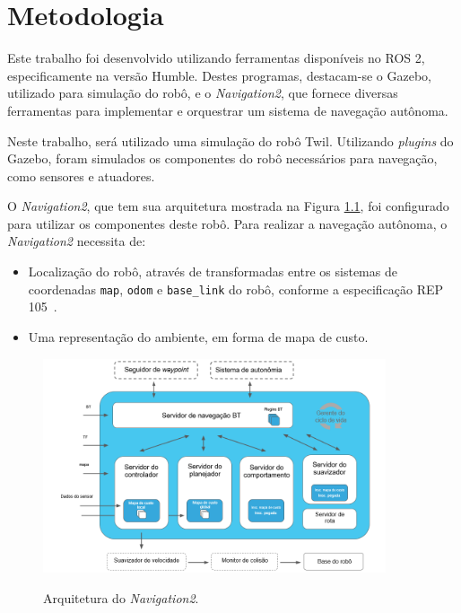 \documentclass[repeatfields,xlists,xpacks,oneside,yearsonly]{ufrgscca}
\begin{document}
\chapter{Metodologia}
\label{desenvolvimento}

Este trabalho foi desenvolvido utilizando ferramentas disponíveis 
no ROS 2, especificamente na versão Humble.
Destes programas, destacam-se o Gazebo, utilizado para simulação do robô,
e o \textit{Navigation2}, que fornece diversas ferramentas para implementar
e orquestrar um sistema de navegação autônoma.

Neste trabalho, será utilizado uma simulação do robô Twil.
Utilizando \textit{plugins} do Gazebo, foram simulados
os componentes do robô necessários para navegação,
como sensores e atuadores.

O \textit{Navigation2}, que tem sua arquitetura mostrada na Figura
 \ref{fig:nav2_arc}, foi configurado para utilizar os componentes
 deste robô.
Para realizar a navegação autônoma, o \textit{Navigation2} necessita de:
\begin{itemize}
    \item Localização do robô, através de transformadas entre os sistemas de coordenadas \texttt{map}, \texttt{odom} e \texttt{base\_link} do robô,
    conforme a especificação REP 105~\cite{rep_105}.
    \item Uma representação do ambiente, em forma de mapa de custo.
\end{itemize}

\begin{figure}[h]
    {
        \centering
        \caption{Arquitetura do \textit{Navigation2}.}
        \label{fig:nav2_arc}
        \includegraphics[width=0.9\textwidth]{nav2_architecture_trad.png}\\
    }
    {} %
\end{figure}
\end{document}
